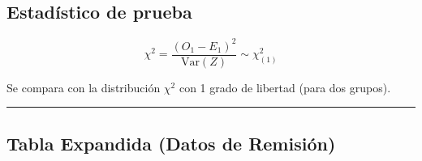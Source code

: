 \documentclass[
]{article}
\begin{document}
\subsection{Estadístico de prueba}\label{estaduxedstico-de-prueba}

\[
\chi^2 = \frac{(O_1 - E_1)^2}{\text{Var}(Z)} \sim \chi^2_{(1)}
\]

Se compara con la distribución \(\chi^2\) con 1 grado de libertad (para
dos grupos).

\begin{center}\rule{0.5\linewidth}{0.5pt}\end{center}

\subsection{Tabla Expandida (Datos de
Remisión)}\label{tabla-expandida-datos-de-remisiuxf3n}
\end{document}
